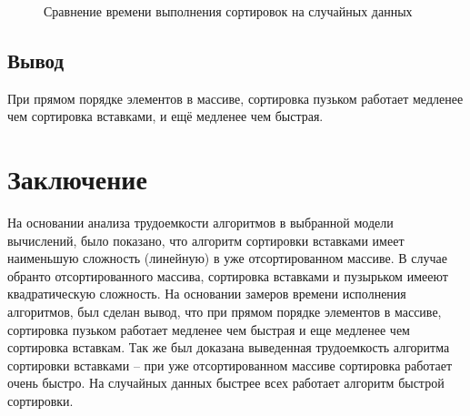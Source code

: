 \documentclass[12pt]{report}
\begin{document}
\newpage

\begin{figure}[h!]
	\begin{center}
	\end{center}
	\caption{Сравнение времени выполнения сортировок на случайных данных}
\end{figure}

\section{Вывод}

При прямом порядке элементов в массиве, сортировка пузьком работает медленее чем сортировка вставками, и ещё медленее чем быстрая.


\chapter*{Заключение}

На основании анализа трудоемкости алгоритмов в выбранной модели вычислений, было показано, что алгоритм сортировки вставками имеет наименьшую сложность (линейную) в уже отсортированном массиве. В случае обранто отсортированного массива, сортировка вставками и пузырьком имееют квадратическую сложность. На основании замеров времени исполнения алгоритмов, был сделан вывод, что при прямом порядке элементов в массиве, сортировка пузьком работает медленее чем быстрая и еще медленее чем сортировка вставкам. Так же был доказана выведенная трудоемкость алгоритма сортировки вставками -- при  уже отсортированном массиве сортировка работает очень быстро. На случайных данных быстрее всех работает алгоритм быстрой сортировки.
\end{document}
